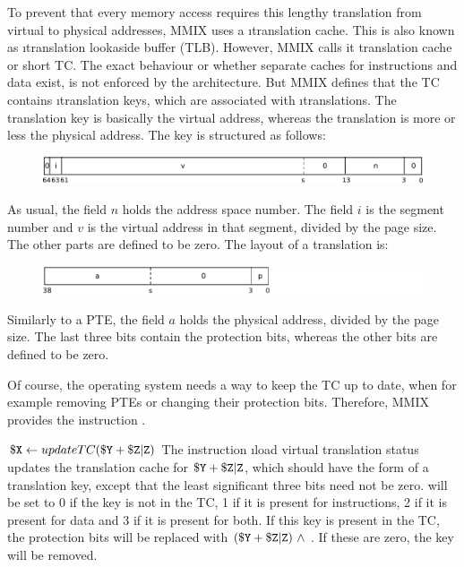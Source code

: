 To prevent that every memory access requires this lengthy translation from virtual to physical addresses, MMIX uses a \i{translation cache}. This is also known as \i{translation lookaside buffer} (TLB). However, MMIX calls it translation cache or short TC. The exact behaviour or whether separate caches for instructions and data exist, is not enforced by the architecture. But MMIX defines that the TC contains \i{translation keys}, which are associated with \i{translations}. The translation key is basically the virtual address, whereas the translation is more or less the physical address. The key is structured as follows:
\begin{figure}[H]
	\centering
	\includegraphics[width=\textwidth]{img/TC-key-crop.pdf}
\end{figure}
\vspace{-20pt}
\noindent As usual, the field $n$ holds the address space number. The field $i$ is the segment number and $v$ is the virtual address in that segment, divided by the page size. The other parts are defined to be zero. The layout of a translation is:
\begin{figure}[H]
	\centering
	\includegraphics[width=\textwidth]{img/TC-trans-crop.pdf}
\end{figure}
\vspace{-20pt}
\noindent Similarly to a PTE, the field $a$ holds the physical address, divided by the page size. The last three bits contain the protection bits, whereas the other bits are defined to be zero. \citep[pg. 37]{mmix-doc}

Of course, the operating system needs a way to keep the TC up to date, when for example removing PTEs or changing their protection bits. Therefore, MMIX provides the instruction .

\instrtbl
	{}
	{${\tt \$X} \leftarrow updateTC({\tt \$Y} + {\tt \$Z}{\tt|Z})$}
\noindent The instruction \i{load virtual translation status} updates the translation cache for ${\tt \$Y} + {\tt \$Z}{\tt|Z}$, which should have the form of a translation key, except that the least significant three bits need not be zero.  will be set to 0 if the key is not in the TC, 1 if it is present for instructions, 2 if it is present for data and 3 if it is present for both. If this key is present in the TC, the protection bits will be replaced with $({\tt \$Y} + {\tt \$Z}{\tt|Z})~\land~$. If these are zero, the key will be removed. \citep[pg. 37]{mmix-doc}

